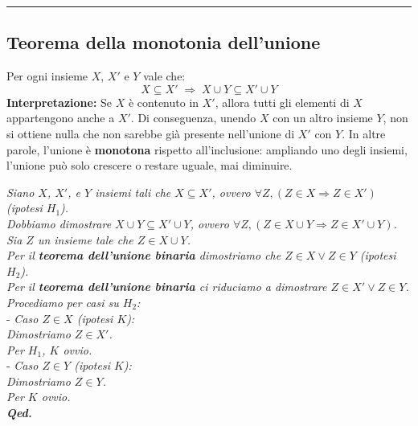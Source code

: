 \documentclass[
  a4paper,
]{article}
\begin{document}
\par\noindent\rule{\linewidth}{0.4pt}\par\vspace{6pt}

\hypertarget{teorema-della-monotonia-dellunione}{%
\subsection{Teorema della monotonia
dell'unione}\label{teorema-della-monotonia-dellunione}}

Per ogni insieme \(X\), \(X'\) e \(Y\) vale che: \[
X \subseteq X' \;\Rightarrow\; X \cup Y \subseteq X' \cup Y
\] \textbf{Interpretazione:} Se \(X\) è contenuto in \(X'\), allora
tutti gli elementi di \(X\) appartengono anche a \(X'\). Di conseguenza,
unendo \(X\) con un altro insieme \(Y\), non si ottiene nulla che non
sarebbe già presente nell'unione di \(X'\) con \(Y\). In altre parole,
l'unione è \textbf{monotona} rispetto all'inclusione: ampliando uno
degli insiemi, l'unione può solo crescere o restare uguale, mai
diminuire.

\begin{examplebox}[Dimostrazione]

\emph{Siano \(X\), \(X'\), e \(Y\) insiemi tali che \(X \subseteq X'\),
ovvero \(\forall Z , (Z \in X \Rightarrow Z \in X')\) (ipotesi
\(H_1\)).}\\
\emph{Dobbiamo dimostrare \(X \cup Y \subseteq X' \cup Y\), ovvero
\(\forall Z , (Z \in X \cup Y \Rightarrow Z \in X' \cup Y)\).}\\
\emph{Sia \(Z\) un insieme tale che \(Z \in X \cup Y\).}\\
\emph{Per il \textbf{teorema dell'unione binaria} dimostriamo che
\(Z \in X \lor Z \in Y\) (ipotesi \(H_2\)).}\\
\emph{Per il \textbf{teorema dell'unione binaria} ci riduciamo a
dimostrare \(Z \in X' \lor Z \in Y\).}\\
\emph{Procediamo per casi su \(H_2\):}\\
- \emph{Caso \(Z \in X\) (ipotesi \(K\)):}\\
\emph{Dimostriamo \(Z \in X'\).}\\
\emph{Per \(H_1\), \(K\) ovvio.}\\
- \emph{Caso \(Z \in Y\) (ipotesi \(K\)):}\\
\emph{Dimostriamo \(Z \in Y\).}\\
\emph{Per \(K\) ovvio.}\\
\textbf{\emph{Qed.}}

\end{examplebox}
\end{document}
